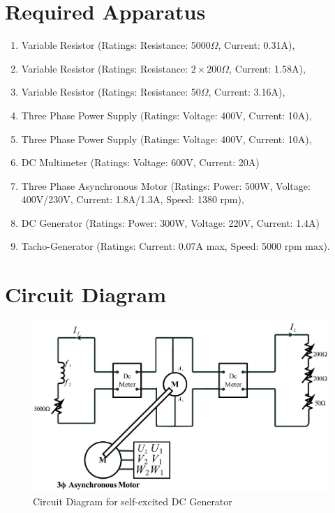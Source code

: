 \documentclass[a4paper,12pt]{article}
\begin{document}
\section{Required Apparatus}
\begin{enumerate}
	\item Variable Resistor (Ratings: Resistance: 5000$\Omega$, Current: 0.31A),
	\item Variable Resistor (Ratings: Resistance: $2\times 200$$\Omega$, Current: 1.58A),
	\item Variable Resistor (Ratings: Resistance: 50$\Omega$, Current: 3.16A),
	\item Three Phase Power Supply (Ratings: Voltage: 400V, Current: 10A),
	\item Three Phase Power Supply (Ratings: Voltage: 400V, Current: 10A),	
\item DC Multimeter (Ratings: Voltage: 600V, Current: 20A) 
\item Three Phase Asynchronous Motor (Ratings: Power: 500W, Voltage: 400V/230V, Current: 1.8A/1.3A, Speed: 1380 rpm),
\item DC Generator (Ratings: Power: 300W, Voltage: 220V, Current: 1.4A)
\item Tacho-Generator (Ratings: Current: 0.07A max, Speed: 5000 rpm max).
\end{enumerate}
\section{Circuit Diagram}
\begin{figure}[H]
	\centering
	\includegraphics[width=0.76\linewidth]{Images/3}
	\caption{Circuit Diagram for self-excited DC Generator}
	\label{fig:2}
\end{figure}





\newpage
\end{document}
